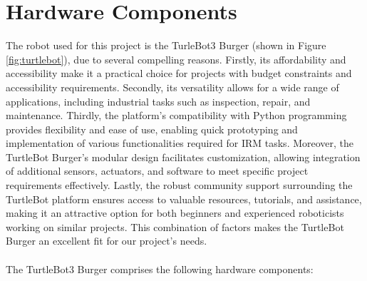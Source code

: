 \documentclass{article}
\begin{document}
\section{Hardware Components}
The robot used for this project is the TurleBot3 Burger (shown in Figure \ref{fig:turtlebot}), due to several compelling reasons.
Firstly, its affordability and accessibility make it a practical choice for projects with budget constraints and accessibility requirements. 
Secondly, its versatility allows for a wide range of applications, including industrial tasks such as inspection, repair, and maintenance. 
Thirdly, the platform's compatibility with Python programming provides flexibility and ease of use, enabling quick prototyping and implementation of various functionalities required for IRM tasks. 
Moreover, the TurtleBot Burger's modular design facilitates customization, allowing integration of additional sensors, actuators, and software to meet specific project requirements effectively.
Lastly, the robust community support surrounding the TurtleBot platform ensures access to valuable resources, tutorials, and assistance, making it an attractive option for both beginners and experienced roboticists working on similar projects. This combination of factors makes the TurtleBot Burger an excellent fit for our project's needs.
\\ \\
The TurtleBot3 Burger comprises the following hardware components:
\end{document}
